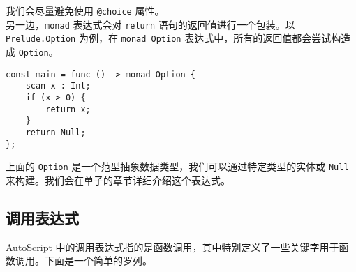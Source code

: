 我们会尽量避免使用 \lstinline!@choice! 属性。 \\

另一边，\lstinline!monad! 表达式会对 \lstinline!return! 语句的返回值进行一个包装。以 \lstinline!Prelude.Option! 为例，在 \lstinline!monad Option! 表达式中，所有的返回值都会尝试构造成 \lstinline!Option!。

\begin{lstlisting}
const main = func () -> monad Option {
	scan x : Int;
	if (x > 0) {
		return x;
	}
	return Null;
};
\end{lstlisting}

上面的 \lstinline!Option! 是一个范型抽象数据类型，我们可以通过特定类型的实体或 \lstinline!Null! 来构建。我们会在单子的章节详细介绍这个表达式。

\subsection{调用表达式}

AutoScript 中的调用表达式指的是函数调用，其中特别定义了一些关键字用于函数调用。下面是一个简单的罗列。

